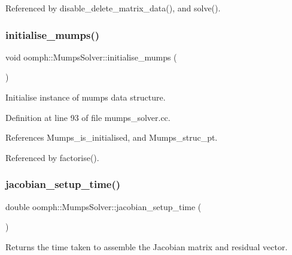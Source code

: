 Referenced by disable\+\_\+delete\+\_\+matrix\+\_\+data(), and solve().

\mbox{\label{classoomph_1_1MumpsSolver_ae5e186152100c7d5f045d3df2a115c72}} 
\subsubsection{\texorpdfstring{initialise\+\_\+mumps()}{initialise\_mumps()}}
{\footnotesize\ttfamily void oomph\+::\+Mumps\+Solver\+::initialise\+\_\+mumps (\begin{DoxyParamCaption}{ }\end{DoxyParamCaption})\hspace{0.3cm}{\ttfamily [private]}}



Initialise instance of mumps data structure. 



Definition at line 93 of file mumps\+\_\+solver.\+cc.



References Mumps\+\_\+is\+\_\+initialised, and Mumps\+\_\+struc\+\_\+pt.



Referenced by factorise().

\mbox{\label{classoomph_1_1MumpsSolver_aea9e3eead627f8f8963f7b5c70b669f7}} 
\subsubsection{\texorpdfstring{jacobian\+\_\+setup\+\_\+time()}{jacobian\_setup\_time()}}
{\footnotesize\ttfamily double oomph\+::\+Mumps\+Solver\+::jacobian\+\_\+setup\+\_\+time (\begin{DoxyParamCaption}{ }\end{DoxyParamCaption})\hspace{0.3cm}{\ttfamily [inline]}}



Returns the time taken to assemble the Jacobian matrix and residual vector. 



